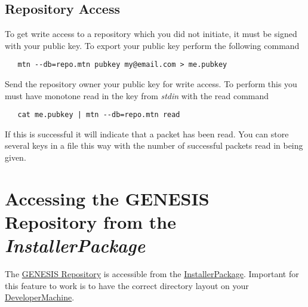 \documentclass[12pt]{article}
\begin{document}
\subsection*{Repository Access}

To get write access to a repository which you did not initiate, it must be signed with your public key. To export your public key perform the following command
\begin{verbatim}
   mtn --db=repo.mtn pubkey my@email.com > me.pubkey 
\end{verbatim}
Send the repository owner your public key for write access. To perform this you must have monotone read in the key from {\it stdin} with the read command
\begin{verbatim}
   cat me.pubkey | mtn --db=repo.mtn read 
\end{verbatim}
If this is successful it will indicate that a packet has been read. You can store several keys in a file this way with the number of successful packets read in being given. 

\section*{Accessing the GENESIS Repository from the {\it InstallerPackage}}

The \href{../genesis-repository/genesis-repository.tex}{GENESIS Repository} is accessible from the \href{../installer-package/installer-package.tex}{InstallerPackage}. Important for this feature to work is to have the correct directory layout on your \href{../developer-machine/developer-machine.tex}{DeveloperMachine}.
\end{document}
